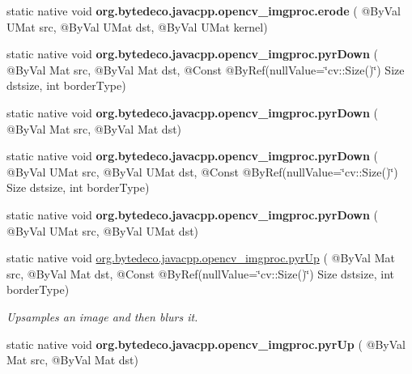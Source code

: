 \begin{DoxyCompactItemize}
\item 
\mbox{\label{group__imgproc__filter_gaa69046fef163679ef621d83d2b3d3862}} 
static native void {\bfseries org.\+bytedeco.\+javacpp.\+opencv\+\_\+imgproc.\+erode} ( @By\+Val U\+Mat src, @By\+Val U\+Mat dst, @By\+Val U\+Mat kernel)
\item 
\mbox{\label{group__imgproc__filter_gaa693157393014e3fb1c9a3b4f69e34b2}} 
static native void {\bfseries org.\+bytedeco.\+javacpp.\+opencv\+\_\+imgproc.\+pyr\+Down} ( @By\+Val Mat src, @By\+Val Mat dst, @Const @By\+Ref(null\+Value=\char`\"{}cv\+::\+Size()\char`\"{}) Size dstsize, int border\+Type)
\item 
\mbox{\label{group__imgproc__filter_ga6167f0b3199c77f153568fef1ec87d40}} 
static native void {\bfseries org.\+bytedeco.\+javacpp.\+opencv\+\_\+imgproc.\+pyr\+Down} ( @By\+Val Mat src, @By\+Val Mat dst)
\item 
\mbox{\label{group__imgproc__filter_ga12e2b2a852d66ee84fc6f8f12bd1595d}} 
static native void {\bfseries org.\+bytedeco.\+javacpp.\+opencv\+\_\+imgproc.\+pyr\+Down} ( @By\+Val U\+Mat src, @By\+Val U\+Mat dst, @Const @By\+Ref(null\+Value=\char`\"{}cv\+::\+Size()\char`\"{}) Size dstsize, int border\+Type)
\item 
\mbox{\label{group__imgproc__filter_ga009cea20a2927a644c664d67064ce059}} 
static native void {\bfseries org.\+bytedeco.\+javacpp.\+opencv\+\_\+imgproc.\+pyr\+Down} ( @By\+Val U\+Mat src, @By\+Val U\+Mat dst)
\item 
static native void \hyperlink{group__imgproc__filter_ga3fc37612b218d8cee2f4b099a8d0a2aa}{org.\+bytedeco.\+javacpp.\+opencv\+\_\+imgproc.\+pyr\+Up} ( @By\+Val Mat src, @By\+Val Mat dst, @Const @By\+Ref(null\+Value=\char`\"{}cv\+::\+Size()\char`\"{}) Size dstsize, int border\+Type)
\begin{DoxyCompactList}\small\item\em Upsamples an image and then blurs it. \end{DoxyCompactList}\item 
\mbox{\label{group__imgproc__filter_ga55da6cb1d91eb7a7504e550a0ac6e3d3}} 
static native void {\bfseries org.\+bytedeco.\+javacpp.\+opencv\+\_\+imgproc.\+pyr\+Up} ( @By\+Val Mat src, @By\+Val Mat dst)

\end{DoxyCompactItemize}
